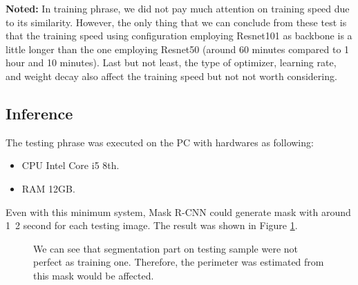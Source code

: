 	\textbf{Noted:} In training phrase, we did not pay much attention on training speed due to its similarity. However, the only thing that we can conclude from these test is that the training speed using configuration employing Resnet101 as backbone is a little longer than the one employing Resnet50 (around 60 minutes compared to 1 hour and 10 minutes). Last but not least, the type of optimizer, learning rate, and weight decay also affect the training speed but not not worth considering.
	
\subsection{Inference}
\label{subsection:mrcnn_inference}
\noindent
	
	The testing phrase was executed on the PC with hardwares as following:
	
	\begin{itemize}
		\item CPU Intel Core i5 8th.
		\item RAM 12GB.
	\end{itemize}
	
	Even with this minimum system, Mask R-CNN could generate mask with around 1~2 second for each testing image. The result was shown in Figure \ref{fig:train_test_result}.
	
	\begin{figure}[H]
		\centering
		\hfill %
		\hfill %
		\caption{We can see that segmentation part on testing sample were not perfect as training one. Therefore, the perimeter was estimated from this mask would be affected.}
		\label{fig:train_test_result}
	\end{figure}
	
